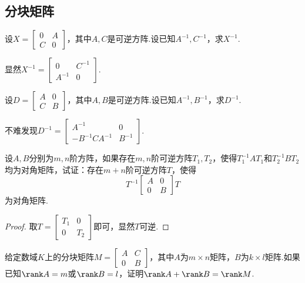\subsection{分块矩阵}
\begin{prob}[2]
	设$X=\begin{bmatrix}
			0 & A \\C&0
		\end{bmatrix}$，其中$A,C$是可逆方阵.设已知$A^{-1},C^{-1}$，求$X^{-1}$.
\end{prob}
\begin{sol}
	显然$X^{-1}=\begin{bmatrix}
			0 & C^{-1} \\A^{-1}&0
		\end{bmatrix}$.
\end{sol}
\begin{prob}[3]
	设$D=\begin{bmatrix}
			A & 0 \\C&B
		\end{bmatrix}$，其中$A,B$是可逆方阵.设已知$A^{-1},B^{-1}$，求$D^{-1}$.
\end{prob}
\begin{sol}
	不难发现$D^{-1}=\begin{bmatrix}
			A^{-1}         & 0      \\
			-B^{-1}CA^{-1} & B^{-1}
		\end{bmatrix}$.
\end{sol}
\begin{prob}[4]
	设$A,B$分别为$m,n$阶方阵，如果存在$m,n$阶可逆方阵$T_1,T_2$，使得$T_1^{-1}AT_1$和$T_2^{-1}BT_2$均为对角矩阵，试证：存在$m+n$阶可逆方阵$T$，使得
	\[
		T^{-1}\begin{bmatrix}
			A & 0 \\0&B
		\end{bmatrix}T
	\]
	为对角矩阵.
\end{prob}
\begin{proof}
	取$T=\begin{bmatrix}
			T_1 & 0   \\
			0   & T_2
		\end{bmatrix}$即可，显然$T$可逆.
\end{proof}
\begin{prob}[5]
	给定数域$K$上的分块矩阵$M=\begin{bmatrix}
			A & C \\0&B
		\end{bmatrix}$，其中$A$为$m\times n$矩阵，$B$为$k\times l$矩阵.如果已知$\rank A=m$或$\rank B=l$，证明$\rank A+\rank B=\rank M$.
\end{prob}
